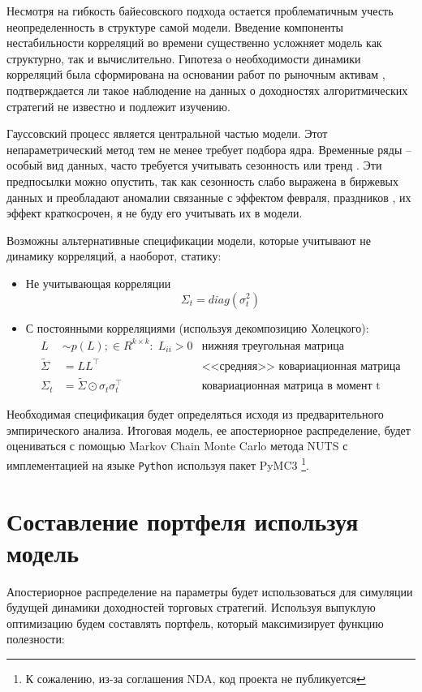Несмотря на гибкость байесовского подхода остается проблематичным учесть неопределенность в структуре самой модели. Введение компоненты нестабильности корреляций во времени существенно усложняет модель как структурно, так и вычислительно. Гипотеза о необходимости динамики корреляций была сформирована на основании работ по рыночным активам \citep{vaga1990, oral2017}, подтверждается ли такое наблюдение на данных о доходностях алгоритмических стратегий не известно и подлежит изучению.

Гауссовский процесс является центральной частью модели. Этот непараметрический метод тем не менее требует подбора ядра. Временные ряды -- особый вид данных, часто требуется учитывать сезонность или тренд \citep{taylor2017}. Эти предпосылки можно опустить, так как сезонность слабо выражена в биржевых данных и преобладают аномалии связанные с эффектом февраля, праздников \citep{ziemba2011}, их эффект краткосрочен, я не буду его учитывать их в модели.

Возможны альтернативные спецификации модели, которые учитывают не динамику корреляций, а наоборот, статику:
\begin{itemize}
	\item Не учитывающая корреляции
	\begin{equation}
	\Sigma_t = diag(\sigma^2_t)\label{eq:nocorr}
	\end{equation}
	
	\item С постоянными корреляциями (используя декомпозицию Холецкого):
	\begin{align}
	L &\sim p(L);\in R^{k\times k}:\; L_{ii} > 0 & \text{нижняя треугольная матрица}\nonumber\\
	\tilde{\Sigma} &= LL^\top & \text{<<средняя>> ковариационная матрица}\nonumber\\
	\Sigma_t &= \tilde{\Sigma} \odot \sigma_t\sigma_t^\top & \text{ковариационная матрица в момент t}\label{eq:staticcorr}
	\end{align}
\end{itemize}


Необходимая спецификация будет определяться исходя из предварительного эмпирического анализа. Итоговая модель, ее апостериорное распределение, будет оцениваться с помощью Markov Chain Monte Carlo метода NUTS \citep{hoffman2011nuts} с имплементацией на языке \texttt{Python} используя пакет PyMC3 \citep{salvatier2016pymc3}\footnote{К сожалению, из-за соглашения NDA, код проекта не публикуется}.

\section{Составление портфеля используя модель}
Апостериорное распределение на параметры будет использоваться для симуляции будущей динамики доходностей торговых стратегий. Используя выпуклую оптимизацию будем составлять портфель, который максимизирует функцию полезности:

